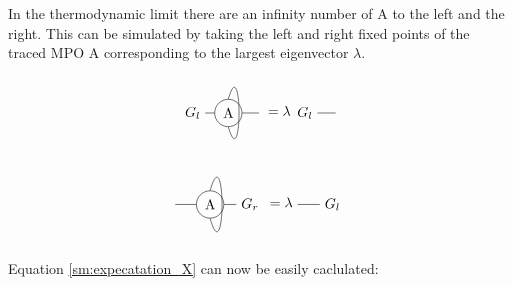 In the thermodynamic limit there are an infinity number of A to the left and the right. This can be simulated by taking the left and right fixed points of the traced MPO A corresponding to the largest eigenvector $\lambda$.

\begin{equation}
    \begin{tikzpicture}[baseline={0cm-0.5*height("$=$")} , scale=0.9]
        \clip (-1.4,-1) rectangle (1,1);
        \node[] (N0) at (-1,0) {$G_l$};
        \node[] (N2) at (1,0) {};
        \node[circle, draw] (N1) at (0,0) {A};
        \draw  (N0) -- (N1) ;
        \draw  (N1) -- (N2) ;
        \draw (N1.north)   .. controls +(0.4,1.4) and +(0.4,-1.4) .. (N1.south);
    \end{tikzpicture}
    = \lambda
    \begin{tikzpicture}[baseline={0cm-0.5*height("$=$")}, scale=0.9 ]
        \clip (-.4,0.5) rectangle (1,-0.5);
        \node[] (N2) at (1,0) {};
        \node[] (N1) at (0,0) {$G_l$};
        \draw  (N1) -- (N2) ;
    \end{tikzpicture}
\end{equation}

\begin{equation}
    \begin{tikzpicture}[baseline={0cm-0.5*height("$=$")} ]
        \clip (-1,-1) rectangle (1.4,1);
        \node[] (N0) at (-1,0) {};
        \node[] (N2) at (1,0) {$G_r$};
        \node[circle, draw] (N1) at (0,0) {A};
        \draw  (N0) -- (N1) ;
        \draw  (N1) -- (N2) ;
        \draw (N1.north)   .. controls +(0.4,1.4) and +(0.4,-1.4) .. (N1.south);
    \end{tikzpicture}
    = \lambda
    \begin{tikzpicture}[baseline={0cm-0.5*height("$=$")} ]
        \clip (0,-0.5) rectangle (1.4,0.5);
        \node[] (N2) at (1,0) {$G_l$};
        \node[] (N1) at (0,0) {};
        \draw  (N1) -- (N2) ;
    \end{tikzpicture}
\end{equation}

Equation \cref{sm:expecatation_X} can now be easily caclulated:

